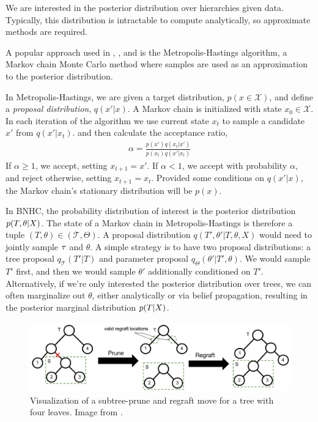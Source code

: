 We are interested
in the posterior distribution
over hierarchies given data.
Typically, this distribution
is intractable to compute
analytically, so approximate
methods are required.

A popular approach used
in \citet{Neal2003}, \citet{Knowles2015}, and \citet{Boyles2012}
is the Metropolis-Hastings
algorithm,
a Markov chain Monte Carlo
method where samples
are used as an approximation
to the posterior distribution.

In Metropolis-Hastings,
we are given a target
distribution, $p(x \in \mathcal{X})$, and
define a \emph{proposal distribution}, $q(x' | x)$.
A Markov chain is initialized with state $x_0 \in \mathcal{X}$.
In each iteration of the algorithm
we use current state $x_t$
to sample a candidate $x'$ from $q(x' | x_t)$.
and then calculate
the acceptance ratio, 
\begin{align}
    \alpha = \frac{p(x')q(x_t | x')}{p(x_t)q(x' | x_t)}
\end{align}
If $\alpha \ge 1$, we accept,
setting $x_{t + 1} = x'$.
If $\alpha < 1$, we accept
with probability $\alpha$, and reject
otherwise, setting $x_{t + 1} = x_t$.
Provided some conditions on $q(x' | x)$,
the Markov chain's stationary distribution
will be $p(x)$.

In BNHC, the probability distribution
of interest
is the posterior distribution $p(T, \theta | X)$.
The state of a Markov chain in Metropolis-Hastings is therefore
a tuple $(T, \theta) \in (\mathcal{T}, \Theta)$.
A proposal distribution $q(T', \theta' | T, \theta, X)$ would need to jointly
sample $\tau$ and $\theta$.
A simple strategy is to have two proposal distributions: a 
tree proposal $q_\mathcal{T}(T' | T)$
and parameter proposal $q_\Theta(\theta' | T', \theta)$. 
We would sample $T'$ first,
and then we would sample $\theta'$ 
additionally conditioned on $T'$.
Alternatively, if we're only interested
the posterior distribution over trees,
we can often marginalize out $\theta$, either
analytically or via belief propagation,
resulting in the posterior marginal
distribution $p(T | X)$.

\begin{figure}[t]
  \includegraphics[width=\textwidth]{img/trees/spr}
  \caption{Visualization of a subtree-prune and regraft move for a
  tree with four leaves. Image from \citet{Vikram2016}.}
\label{fig:spr}
\end{figure}

